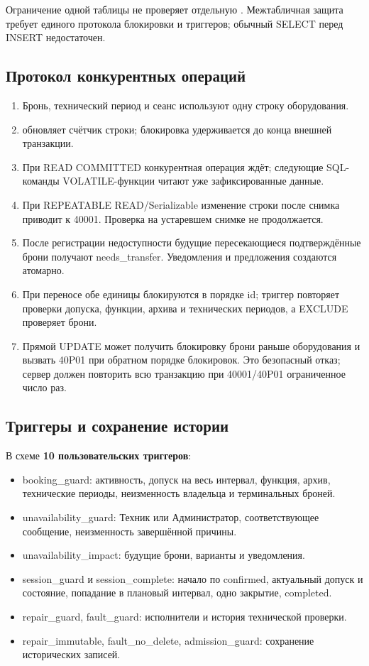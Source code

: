 \documentclass[12pt,a4paper]{article}
\newcommand{\code}[1]{\texttt{\detokenize{#1}}}
\begin{document}
Ограничение одной таблицы \code{booking} не проверяет отдельную
\code{unavailability}. Межтабличная защита требует единого протокола блокировки
и триггеров; обычный SELECT перед INSERT недостаточен.

\subsection{Протокол конкурентных операций}
\begin{enumerate}
\item Бронь, технический период и сеанс используют одну строку оборудования.
\item \code{lock_equipment} обновляет счётчик строки; блокировка удерживается
до конца внешней транзакции.
\item При READ COMMITTED конкурентная операция ждёт; следующие SQL-команды
VOLATILE-функции читают уже зафиксированные данные.
\item При REPEATABLE READ/Serializable изменение строки после снимка приводит
к 40001. Проверка на устаревшем снимке не продолжается.
\item После регистрации недоступности будущие пересекающиеся подтверждённые
брони получают needs\_transfer. Уведомления и предложения создаются атомарно.
\item При переносе обе единицы блокируются в порядке id; триггер повторяет
проверки допуска, функции, архива и технических периодов, а EXCLUDE проверяет брони.
\item Прямой UPDATE может получить блокировку брони раньше оборудования и
вызвать 40P01 при обратном порядке блокировок. Это безопасный отказ; сервер
должен повторить всю транзакцию при 40001/40P01 ограниченное число раз.
\end{enumerate}

\subsection{Триггеры и сохранение истории}
В схеме \textbf{10 пользовательских триггеров}:
\begin{itemize}
\item booking\_guard: активность, допуск на весь интервал, функция, архив,
технические периоды, неизменность владельца и терминальных броней.
\item unavailability\_guard: Техник или Администратор, соответствующее сообщение,
неизменность завершённой причины.
\item unavailability\_impact: будущие брони, варианты и уведомления.
\item session\_guard и session\_complete: начало по confirmed, актуальный допуск
и состояние, попадание в плановый интервал, одно закрытие, completed.
\item repair\_guard, fault\_guard: исполнители и история технической проверки.
\item repair\_immutable, fault\_no\_delete,
admission\_guard: сохранение исторических записей.
\end{itemize}
\end{document}
